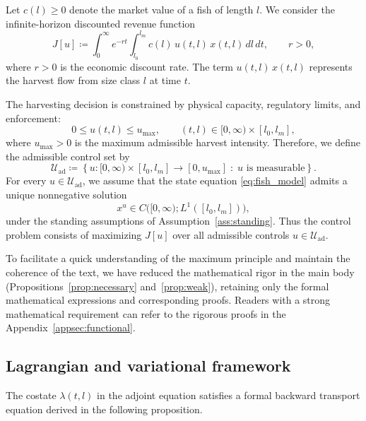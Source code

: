 \documentclass[pdflatex,sn-mathphys-num]{sn-jnl}
\theoremstyle{thmstyleone}
\theoremstyle{definition}
\theoremstyle{remark}
\begin{document}
Let $c(l)\ge 0$ denote the market value of a fish of length $l$. We consider the
infinite-horizon discounted revenue function
\begin{equation}\label{eq:objective_J}
J[u]
\coloneqq
\int_{0}^{\infty} e^{-rt}
\int_{l_0}^{l_m} c(l)\,u(t,l)\,x(t,l)\,dl\,dt,
\qquad r>0,
\end{equation}
where $r>0$ is the economic discount rate. The term $u(t,l)\,x(t,l)$ represents
the harvest flow from size class $l$ at time $t$.

The harvesting decision is constrained by physical capacity, regulatory limits,
and enforcement:
\begin{equation}\label{eq:control_bounds}
0\le u(t,l)\le u_{\max},
\qquad (t,l)\in[0,\infty)\times[l_0,l_m],
\end{equation}
where $u_{\max}>0$ is the maximum admissible harvest intensity.
Therefore, we define the admissible control set by
\begin{equation}\label{eq:admissible_set}
\mathcal{U}_{\mathrm{ad}}
\coloneqq
\left\{
u:[0,\infty)\times[l_0,l_m]\to[0,u_{\max}]
\;:\;
u \text{ is measurable}
\right\}.
\end{equation}
For every $u\in\mathcal{U}_{\mathrm{ad}}$, we assume that the state equation
\eqref{eq:fish_model} admits a unique nonnegative solution
\[
x^u \in C\big([0,\infty);L^1([l_0,l_m])\big),
\]
under the standing assumptions of Assumption~\ref{ass:standing}. Thus the control
problem consists of maximizing $J[u]$ over all admissible controls
$u\in\mathcal{U}_{\mathrm{ad}}$.

To facilitate a quick understanding of the maximum principle and maintain the coherence of the text, we have reduced the mathematical rigor in the main body (Propositions~\ref{prop:necessary} and~\ref{prop:weak}), retaining only the formal mathematical expressions and corresponding proofs. Readers with a strong mathematical requirement can refer to the rigorous proofs in the Appendix~\ref{appsec:functional}.

\subsection{Lagrangian and variational framework}\label{subsec:lagrangian}

The costate $\lambda(t,l)$ in the adjoint equation satisfies a formal backward transport equation
derived in the following proposition.
\end{document}

